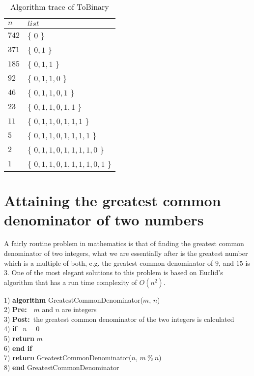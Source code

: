 \begin{table}[h]
\begin{center}
\begin{tabular}{|l|l|}
\hline
$n$ & $list$ \\
\hline
$742$ & \{ $0$ \} \\
\hline
$371$ & \{ $0, 1$ \} \\
\hline
$185$ & \{ $0, 1, 1$ \} \\
\hline
$92$ & \{ $0, 1, 1, 0$ \} \\
\hline
$46$ & \{ $0, 1, 1, 0, 1$ \} \\
\hline
$23$ & \{ $0, 1, 1, 0, 1, 1$ \} \\
\hline
$11$ & \{ $0, 1, 1, 0, 1, 1, 1$ \} \\
\hline
$5$ & \{ $0, 1, 1, 0, 1, 1, 1, 1$ \} \\
\hline
$2$ & \{ $0, 1, 1, 0, 1, 1, 1, 1, 0$ \} \\
\hline
$1$ & \{ $0, 1, 1, 0, 1, 1, 1, 1, 0, 1$ \} \\
\hline
\end{tabular}
\end{center}
\caption{Algorithm trace of ToBinary} \label{tab:tobinary_trace}
\end{table}

\section{Attaining the greatest common denominator of two numbers}
A fairly routine problem in mathematics is that of finding the greatest common denominator of two integers, what we are essentially after is the greatest number which is a multiple of both, e.g. the greatest common denominator of $9$, and $15$ is $3$. One of the most elegant solutions to this problem is based on Euclid's algorithm that has a run time complexity of $O(n^{2})$.

\begin{tabbing}
1) \textbf{alg}\= \textbf{orithm} GreatestCommonDenominator($m$, $n$)\\
2) \> \textbf{Pre:}~~$m$ and $n$ are integers \\
3) \> \textbf{Post:}~the greatest common denominator of the two integers is calculated \\
4) \> \textbf{if}~\= $n = 0$ \\
5) \> \> \textbf{return} $m$ \\
6) \> \textbf{end if}\\
7) \> \textbf{return} GreatestCommonDenominator($n$, $m~\%~n$) \\
8) \textbf{end} GreatestCommonDenominator\\
\end{tabbing}

